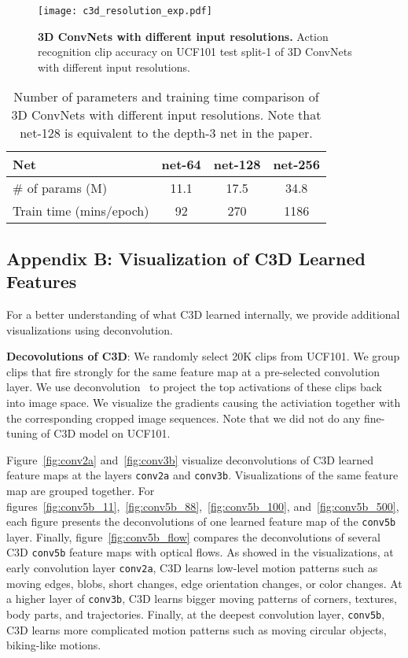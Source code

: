 \documentclass[10pt,twocolumn,letterpaper]{article}
\begin{document}
\begin{figure}
\begin{center}
   \texttt{[image: c3d\_resolution\_exp.pdf]}
\end{center}
   \caption{{\bf 3D ConvNets with different input resolutions.} Action recognition clip accuracy on UCF101 test split-1 of 3D ConvNets with different input resolutions.}
\label{fig:c3d_resolution_exp}
\end{figure}


\begin{table}[h]
\begin{center}
\begin{tabular}{|l|c|c|c|}
\hline
Net & net-64 & net-128 & net-256 \\
\hline
$\#$ of params (M) & 11.1 & 17.5 & 34.8 \\
Train time (mins/epoch) & 92 & 270 & 1186 \\
\hline
\end{tabular}
\end{center}
\caption{Number of parameters and training time comparison of 3D ConvNets with different input resolutions. Note that net-128 is equivalent to the depth-3 net in the paper.}
\label{tab:params}
\end{table} 
\subsection*{Appendix B: Visualization of C3D Learned Features}

For a better understanding of what C3D learned internally, we provide additional visualizations using deconvolution.

{\bf Decovolutions of C3D}: We randomly select 20K clips from UCF101. We group clips that fire strongly for the same feature map at a pre-selected convolution layer. We use deconvolution~\cite{ZeilerF14} to project the top activations of these clips back into image space. We visualize the gradients causing the activiation together with the corresponding cropped image sequences. Note that we did not do any fine-tuning of C3D model on UCF101.

Figure~\ref{fig:conv2a} and~\ref{fig:conv3b} visualize deconvolutions of C3D learned feature maps at the layers \texttt{conv2a} and \texttt{conv3b}. Visualizations of the same feature map are grouped together. For figures~\ref{fig:conv5b_11},~\ref{fig:conv5b_88},~\ref{fig:conv5b_100}, and~\ref{fig:conv5b_500}, each figure presents the deconvolutions of one learned feature map of the \texttt{conv5b} layer. Finally, figure~\ref{fig:conv5b_flow} compares the deconvolutions of several C3D \texttt{conv5b} feature maps with optical flows. As showed in the visualizations, at early convolution layer \texttt{conv2a}, C3D learns low-level motion patterns such as moving edges, blobs, short changes, edge orientation changes, or color changes. At a higher layer of \texttt{conv3b}, C3D learns bigger moving patterns of corners, textures, body parts, and trajectories. Finally, at the deepest convolution layer, \texttt{conv5b}, C3D learns more complicated motion patterns such as moving circular objects, biking-like motions.
\end{document}
